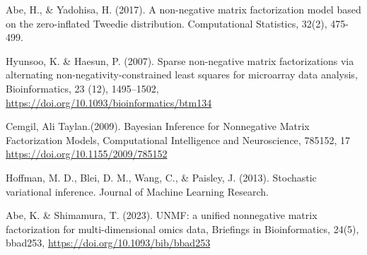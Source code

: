\documentclass[a4paper,12pt]{jsarticle} %
\numberwithin{equation}{section} %
\begin{document}
\begin{thebibliography}{9}
\item{} Abe, H., \& Yadohisa, H. (2017). A non-negative matrix factorization model based on the zero-inflated Tweedie distribution. Computational Statistics, 32(2), 475-499.
\item{}Hyunsoo, K. \&  Haesun, P. (2007). Sparse non-negative matrix factorizations via alternating non-negativity-constrained least squares for microarray data analysis, Bioinformatics,  23 (12), 1495--1502, \url{https://doi.org/10.1093/bioinformatics/btm134}
\item{} Cemgil, Ali Taylan.(2009). Bayesian Inference for Nonnegative Matrix Factorization Models, Computational Intelligence and Neuroscience, 785152, 17 \url{https://doi.org/10.1155/2009/785152}
\item{} Hoffman, M. D., Blei, D. M., Wang, C., \& Paisley, J. (2013). Stochastic variational inference. Journal of Machine Learning Research.
\item{} Abe, K. \& Shimamura, T. (2023). UNMF: a unified nonnegative matrix factorization for multi-dimensional omics data, Briefings in Bioinformatics, 24(5), bbad253, \url{https://doi.org/10.1093/bib/bbad253}
\end{thebibliography}
\end{document}
